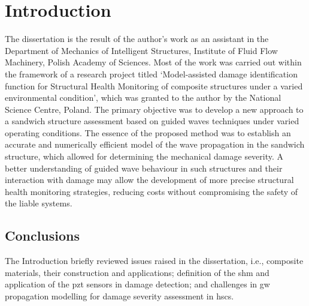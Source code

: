

\chapter[Introduction]{Introduction}
\label{ch:intro}
The dissertation is the result of the author’s work as an assistant in the Department of Mechanics of Intelligent Structures, Institute of Fluid Flow Machinery, Polish Academy of Sciences.
Most of the work was carried out within the framework of a research project titled ‘Model-assisted damage identification function for Structural Health Monitoring of composite structures under a varied environmental condition', which was granted to the author by the National Science Centre, Poland.
The primary objective was to develop a new approach to a sandwich structure assessment based on guided waves techniques under varied operating conditions.
The essence of the proposed method was to establish an accurate and numerically efficient model of the wave propagation in the sandwich structure, which allowed for determining the mechanical damage severity.
A better understanding of guided wave behaviour in such structures and their interaction with damage may allow the development of more precise structural health monitoring strategies, reducing costs without compromising the safety of the liable systems.







\section{Conclusions}
\label{sec:conclusionsIntro}

The Introduction briefly reviewed issues raised in the dissertation, i.e., composite materials, their construction and applications; definition of the \ac{shm} and application of the \ac{pzt} sensors in damage detection; and challenges in \ac{gw} propagation modelling for damage severity assessment in \acp{hsc}.

